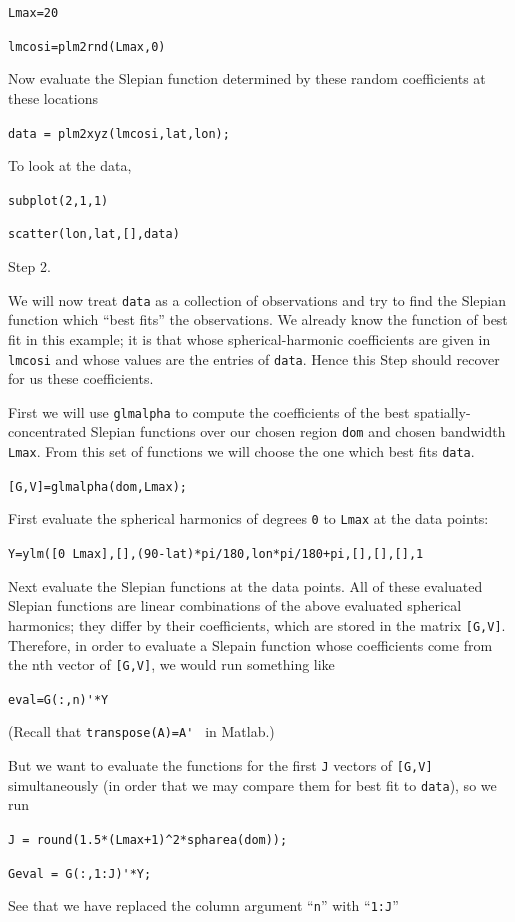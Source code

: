 \documentclass{article}
\begin{document}
\verb!Lmax=20!

\verb!lmcosi=plm2rnd(Lmax,0)!

Now evaluate the Slepian function determined by these random coefficients at these locations

\verb!data = plm2xyz(lmcosi,lat,lon);!

To look at the data,

\verb!subplot(2,1,1)!

\verb!scatter(lon,lat,[],data)!

Step 2.

We will now treat \verb!data! as a collection of observations and try to find the Slepian function which “best fits” the observations. We already know the function of best fit in this example; it is that whose spherical-harmonic coefficients are given in \verb!lmcosi! and whose values are the entries of \verb!data!. Hence this Step should recover for us these coefficients.

First we will use \verb!glmalpha! to compute the coefficients of the best spatially-concentrated Slepian functions over our chosen region \verb!dom! and chosen bandwidth \verb!Lmax!. From this set of functions we will choose the one which best fits \verb!data!.

\verb![G,V]=glmalpha(dom,Lmax);!

First evaluate the spherical harmonics of degrees \verb!0! to \verb!Lmax! at the data points:

\verb!Y=ylm([0 Lmax],[],(90-lat)*pi/180,lon*pi/180+pi,[],[],[],1!

Next evaluate the Slepian functions at the data points. All of these evaluated Slepian functions are linear combinations of the above evaluated spherical harmonics; they differ by their coefficients, which are stored in the matrix \verb+[G,V]+. Therefore, in order to evaluate a Slepain function whose coefficients come from the nth vector of \verb+[G,V]+, we would run something like

\verb!eval=G(:,n)'*Y!

(Recall that \verb!transpose(A)=A' ! in Matlab.)

But we want to evaluate the  functions for the first \verb!J! vectors of \verb![G,V]! simultaneously (in order that we may compare them for best fit to \verb!data!), so we run

\verb!J = round(1.5*(Lmax+1)^2*spharea(dom));!

\verb!Geval = G(:,1:J)'*Y;!

See that we have replaced the column argument “\verb+n+” with “\verb+1:J+”
\end{document}
